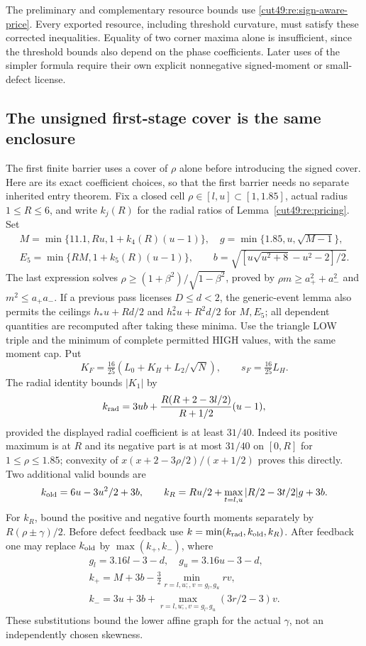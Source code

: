 \documentclass[11pt,a4paper]{article}
\numberwithin{equation}{section}
\theoremstyle{definition}
\theoremstyle{remark}
\begin{document}
The preliminary and complementary resource bounds use
\eqref{cut49:re:sign-aware-price}. Every exported resource, including
threshold curvature, must satisfy these corrected inequalities. Equality
of two corner maxima alone is insufficient, since the threshold bounds
also depend on the phase coefficients. Later uses of the simpler formula require their own explicit
nonnegative signed-moment or small-defect license.

\subsection{The unsigned first-stage cover is the same enclosure}
\label{cut49:re:unsigned}
The first finite barrier uses a cover of $\rho$ alone before introducing
the signed cover. Here are its exact coefficient choices, so that the
first barrier needs no separate inherited entry theorem. Fix a closed
cell $\rho\in[l,u]\subset[1,1.85]$, actual radius $1\le R\le6$, and
write $k_j(R)$ for the radial ratios of Lemma~\ref{cut49:re:pricing}. Set
\begin{gather*}
 M=\min\{11.1,Ru,1+k_4(R)(u-1)\},\quad
 g=\min\{1.85,u,\sqrt{M-1}\},\\
 E_5=\min\{RM,1+k_5(R)(u-1)\},\qquad
 b=\sqrt{[u\sqrt{u^2+8}-u^2-2]/2}.
\end{gather*}
The last expression solves $\rho\ge(1+\beta^2)/\sqrt{1-\beta^2}$,
proved by $\rho m\ge a_+^2+a_-^2$ and $m^2\le a_+a_-$.
If a previous pass licenses $D\le d<2$, the generic-event lemma also
permits the ceilings $h_*u+Rd/2$ and $h_*^2u+R^2d/2$ for $M,E_5$;
all dependent quantities are recomputed after taking these minima.
Use the triangle LOW triple and the minimum of complete permitted HIGH
values, with the same moment cap. Put
\[
 K_F=\tfrac{16}{25}(L_0+K_H+L_2/\sqrt N),\qquad s_F=\tfrac{16}{25}L_H.
\]
The radial identity bounds $|K_1|$ by
\[
 k_{\rm rad}=3ub+
     \frac{R(R+2-3l/2)}{R+1/2}(u-1),
\]
provided the displayed radial coefficient is at least $31/40$.
Indeed its positive maximum is at $R$ and its negative part is at most
$31/40$ on $[0,R]$ for $1\le\rho\le1.85$; convexity of
$x(x+2-3\rho/2)/(x+1/2)$ proves this directly.
Two additional valid bounds are
\[
 k_{\rm old}=6u-3u^2/2+3b,\qquad
 k_R=Ru/2+\max_{t=l,u}|R/2-3t/2|g+3b.
\]
For $k_R$, bound the positive and negative fourth moments separately by
$R(\rho\pm\gamma)/2$. Before defect feedback use
$k=\min(k_{\rm rad},k_{\rm old},k_R)$.
After feedback one may replace $k_{\rm old}$ by $\max(k_+,k_-)$, where
\begin{gather*}
 g_l=3.16l-3-d,\quad g_u=3.16u-3-d,\\
 k_+=M+3b-\tfrac32\min_{r=l,u;,v=g_l,g_u}rv,\\
 k_-=3u+3b+\max_{r=l,u;,v=g_l,g_u}(3r/2-3)v.
\end{gather*}
These substitutions bound the lower affine graph for the actual $\gamma$,
not an independently chosen skewness.
\end{document}
